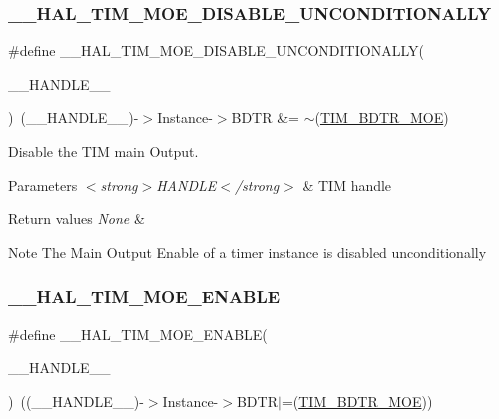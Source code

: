 \subsubsection{\texorpdfstring{\+\_\+\+\_\+\+H\+A\+L\+\_\+\+T\+I\+M\+\_\+\+M\+O\+E\+\_\+\+D\+I\+S\+A\+B\+L\+E\+\_\+\+U\+N\+C\+O\+N\+D\+I\+T\+I\+O\+N\+A\+L\+LY}{\_\_HAL\_TIM\_MOE\_DISABLE\_UNCONDITIONALLY}}
{\footnotesize\ttfamily \#define \+\_\+\+\_\+\+H\+A\+L\+\_\+\+T\+I\+M\+\_\+\+M\+O\+E\+\_\+\+D\+I\+S\+A\+B\+L\+E\+\_\+\+U\+N\+C\+O\+N\+D\+I\+T\+I\+O\+N\+A\+L\+LY(\begin{DoxyParamCaption}\item[{}]{\+\_\+\+\_\+\+H\+A\+N\+D\+L\+E\+\_\+\+\_\+ }\end{DoxyParamCaption})~(\+\_\+\+\_\+\+H\+A\+N\+D\+L\+E\+\_\+\+\_\+)-\/$>$Instance-\/$>$B\+D\+TR \&= $\sim$(\hyperlink{group___peripheral___registers___bits___definition_ga277a096614829feba2d0a4fbb7d3dffc}{T\+I\+M\+\_\+\+B\+D\+T\+R\+\_\+\+M\+OE})}



Disable the T\+IM main Output. 


\begin{DoxyParams}{Parameters}
{\em $<$strong$>$\+H\+A\+N\+D\+L\+E$<$/strong$>$} & T\+IM handle \\
\hline
\end{DoxyParams}

\begin{DoxyRetVals}{Return values}
{\em None} & \\
\hline
\end{DoxyRetVals}
\begin{DoxyNote}{Note}
The Main Output Enable of a timer instance is disabled unconditionally 
\end{DoxyNote}
\mbox{\label{group___t_i_m___exported___macros_ga04890dcef3ed061854721a3672585607}} 
\subsubsection{\texorpdfstring{\+\_\+\+\_\+\+H\+A\+L\+\_\+\+T\+I\+M\+\_\+\+M\+O\+E\+\_\+\+E\+N\+A\+B\+LE}{\_\_HAL\_TIM\_MOE\_ENABLE}}
{\footnotesize\ttfamily \#define \+\_\+\+\_\+\+H\+A\+L\+\_\+\+T\+I\+M\+\_\+\+M\+O\+E\+\_\+\+E\+N\+A\+B\+LE(\begin{DoxyParamCaption}\item[{}]{\+\_\+\+\_\+\+H\+A\+N\+D\+L\+E\+\_\+\+\_\+ }\end{DoxyParamCaption})~((\+\_\+\+\_\+\+H\+A\+N\+D\+L\+E\+\_\+\+\_\+)-\/$>$Instance-\/$>$B\+D\+TR$\vert$=(\hyperlink{group___peripheral___registers___bits___definition_ga277a096614829feba2d0a4fbb7d3dffc}{T\+I\+M\+\_\+\+B\+D\+T\+R\+\_\+\+M\+OE}))}



